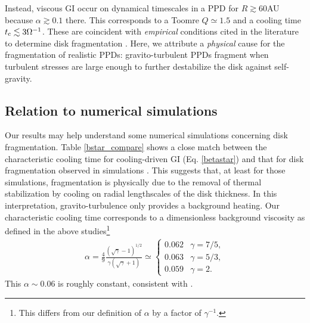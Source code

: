 
Instead, viscous GI occur on dynamical timescales in a PPD for
$R\gtrsim 60$AU because $\alpha\gtrsim0.1$ there. 
This corresponds to a Toomre $Q\simeq 1.5$ and 
a cooling time $t_\mathrm{c}\lesssim 3\Omega^{-1}$. These are coincident with 
\emph{empirical} conditions cited in the literature to determine disk
fragmentation 
\citep[e.g.][]{rafikov15}. Here, we attribute a \emph{physical}
cause for the fragmentation of realistic PPDs: gravito-turbulent PPDs
fragment when turbulent stresses are large enough to further
destabilize the disk against self-gravity.    


\subsection{Relation to numerical simulations}\label{prev_works}
Our results may help understand some numerical simulations 
concerning disk fragmentation. Table 
\ref{bstar_compare} shows a close match between the characteristic
cooling time for cooling-driven GI (Eq. \ref{betastar}) 
and that for disk fragmentation observed in simulations 
\citep{gammie01,rice05,rice11}. This suggests that, at least for those
simulations, fragmentation is physically due to the removal of
thermal stabilization by cooling on radial lengthscales of the disk 
thickness. In this interpretation, gravito-turbulence only
provides a background heating. %
Our characteristic cooling time corresponds to a dimensionless background viscosity 
as defined in the above studies\footnote{This differs from our
  definition of $\alpha$ by a factor of $\gamma^{-1}$.}  
\begin{align}
  \alpha =
  \frac{4}{9}\frac{\left(\sqrt{\gamma}-1\right)^{1/2}}{\gamma\left(\sqrt{\gamma}+1\right)}
  \simeq \begin{cases}
    0.062 & \gamma = 7/5, \\
    0.063 & \gamma = 5/3,\\
    0.059 & \gamma = 2.
  \end{cases}
\end{align}
This $\alpha\sim0.06$ is roughly constant, consistent with \cite{rice05}. 

